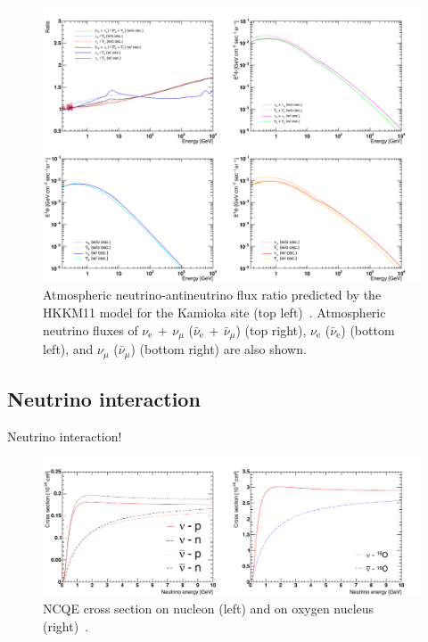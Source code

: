 \begin{figure}[tbp]
	\centering
	\includegraphics[width=14cm]{Figures/Simulation/Ratio}
	\caption[Atmospheric neutrino-antineutrino flux ratio predicted by the HKKM11 model for the Kamioka site]{\label{Simula_Ratio} Atmospheric neutrino-antineutrino flux ratio predicted by the HKKM11 model for the Kamioka site (top left)~\cite{2011Honda}. Atmospheric neutrino fluxes of $\nu_{\text{e}}\,+\,\nu_{\mu}$ ($\bar{\nu}_{\text{e}}\,+\,\bar{\nu}_{\mu}$) (top right), $\nu_{\text{e}}$ ($\bar{\nu}_{\text{e}}$) (bottom left), and $\nu_{\mu}$ ($\bar{\nu}_{\mu}$) (bottom right) are also shown.}
\end{figure}

\subsection{Neutrino interaction}
\vs\hs Neutrino interaction!

\begin{figure}[tbp]
	\centering
	\includegraphics[width=14cm]{Figures/Simulation/NCQECroSec}
	\caption[NCQE cross section on nucleon and on oxygen nucleus]{\label{Simula_NCQECroSec} NCQE cross section on nucleon (left) and on oxygen nucleus (right)~\cite{2012Ankowski}.}
\end{figure}

